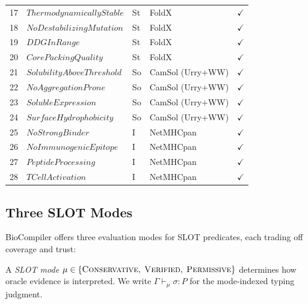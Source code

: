 \documentclass[sigplan,10pt,manuscript,review,anonymous]{acmart}
\newcommand{\seq}{\sigma}
\newcommand{\pred}{P}
\newcommand{\CONSERVATIVE}{\textsc{Conservative}\xspace}
\newcommand{\VERIFIED}{\textsc{Verified}\xspace}
\newcommand{\PERMISSIVE}{\textsc{Permissive}\xspace}
\newcommand{\mode}{\mu}
\newcommand{\evalmode}[4]{#1 \vdash_{#2} #3 : #4}
\begin{document}
\begin{table}[t]
\begin{tabular}{clllc}
17 & $\mathit{ThermodynamicallyStable}$ & St & FoldX                & $\checkmark$ \\
18 & $\mathit{NoDestabilizingMutation}$ & St & FoldX                & $\checkmark$ \\
19 & $\mathit{DDGInRange}$            & St  & FoldX                 & $\checkmark$ \\
20 & $\mathit{CorePackingQuality}$    & St  & FoldX                 & $\checkmark$ \\
\midrule
21 & $\mathit{SolubilityAboveThreshold}$ & So & CamSol (Urry+WW)   & $\checkmark$ \\
22 & $\mathit{NoAggregationProne}$    & So  & CamSol (Urry+WW)     & $\checkmark$ \\
23 & $\mathit{SolubleExpression}$     & So  & CamSol (Urry+WW)     & $\checkmark$ \\
24 & $\mathit{SurfaceHydrophobicity}$ & So  & CamSol (Urry+WW)     & $\checkmark$ \\
\midrule
25 & $\mathit{NoStrongBinder}$        & I   & NetMHCpan             & $\checkmark$ \\
26 & $\mathit{NoImmunogenicEpitope}$  & I   & NetMHCpan             & $\checkmark$ \\
27 & $\mathit{PeptideProcessing}$     & I   & NetMHCpan             & $\checkmark$ \\
28 & $\mathit{TCellActivation}$       & I   & NetMHCpan             & $\checkmark$ \\
\bottomrule
\end{tabular}
\end{table}

\subsection{Three SLOT Modes}\label{sec:slot-modes}

BioCompiler offers three evaluation modes for SLOT predicates, each
trading off coverage and trust:

\begin{definition}
A \emph{SLOT mode} $\mode \in \{\CONSERVATIVE,\; \VERIFIED,\;
\PERMISSIVE\}$ determines how oracle evidence is interpreted.
We write $\evalmode{\Gamma}{\mode}{\seq}{\pred}$ for the mode-indexed
typing judgment.
\end{definition}
\end{document}

